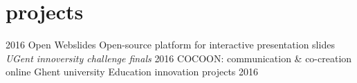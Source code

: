 \documentclass[]{friggeri-cv}
\begin{document}
\section{projects}
\begin{entrylist}
 \entry
 {2016}
 {Open Webslides}
 {}
 {Open-source platform for interactive presentation slides \\ \emph{UGent innoversity challenge finals}}
 \entry
 {2016}
 {COCOON: communication \& co-creation online}
 {Ghent university}
 {Education innovation projects 2016}
% 
 
   
\end{entrylist} 

% 
\end{document}
